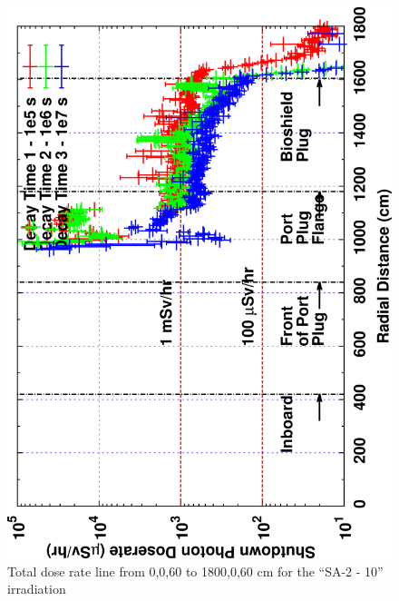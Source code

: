 \documentclass[12pt]{article}
\begin{document}
\begin{figure}[ht!]
\centering
\includegraphics[clip,scale=0.12,angle=-90]{../plots/photon_lineout/5yr/b4c_5yr.png}
\caption{Total dose rate line from 0,0,60 to 1800,0,60 cm for the ``SA-2 - 10'' irradiation}
\label{fig:photons_5y_b4c_dose}
\end{figure}
\end{document}
